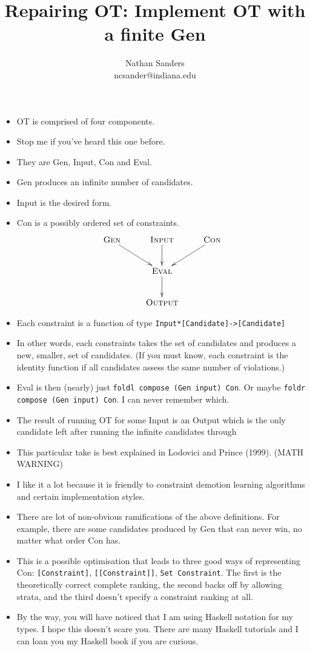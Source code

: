\documentclass{article}[11pt]
\author{Nathan Sanders \\ ncsander@indiana.edu}
\title{Repairing OT: Implement OT with a finite {\sc Gen}}
\begin{document}
\maketitle
\begin{itemize}
\section{The Theory}
\item OT is comprised of four components.
\item Stop me if you've heard this one before.
\item They are {\sc Gen}, {\sc Input}, {\sc Con} and {\sc Eval}.
\item {\sc Gen} produces an infinite number of candidates.
\item {\sc Input} is the desired form.
\item {\sc Con} is a possibly ordered set of constraints.
\begin{displaymath}
  \xymatrix{ \textrm{\sc Gen} \ar[dr] & \textrm{\sc Input} \ar[d] & \textrm{\sc Con}\ar[dl] \\
    & \textrm{\sc Eval} \ar[d] & \\
  & \textrm{\sc Output} & }
\end{displaymath}
\item Each constraint is a function of type
  \verb+Input*[Candidate]->[Candidate]+
\item In other words, each constraints takes the set of candidates and produces
  a new, smaller, set of candidates. (If you must know, each constraint is the
  identity function if all candidates assess the same number of violations.)
\item {\sc Eval} is then (nearly) just \verb+foldl compose (Gen input) Con+.
  Or maybe
  \verb+foldr compose (Gen input) Con+. I can never remember which.
\item The result of running OT for some {\sc Input} is an {\sc Output} which is the only
  candidate left after running the infinite candidates through
\item This particular take is best explained in Lodovici and Prince (1999). (MATH
  WARNING)
\item I like it a lot because it is friendly to constraint demotion learning algorithms
  and certain implementation styles.
\item There are lot of non-obvious ramifications of the above definitions.
  For example, there are some candidates produced by {\sc Gen} that can never
  win, no matter what order {\sc Con} has.
\item This is a possible optimisation that leads to three good ways of representing
  {\sc Con}: \verb+[Constraint]+, \verb+[[Constraint]]+, \verb+Set Constraint+.
  The first is the theoretically correct complete ranking, the second backs off
  by allowing strata, and the third doesn't specify a constraint ranking at all.
\item By the way, you will have noticed that I am using Haskell notation for my
  types. I hope this doesn't scare you. There are many Haskell tutorials and
  I can loan you my Haskell book if you are curious.

\end{itemize}
\end{document}
